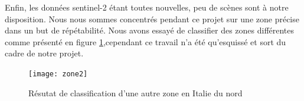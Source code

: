 \documentclass[a4paper,10pt]{article}
\begin{document}
Enfin, les données sentinel-2 étant toutes nouvelles, peu de scènes sont à notre disposition. Nous nous sommes concentrés pendant ce projet sur une zone précise dans un but de répétabilité. Nous avons essayé de classifier des zones différentes comme présenté en figure \ref{fig:zone2},cependant ce travail n'a été qu'esquissé et sort du cadre de notre projet.

\begin{figure}
  \centering
    \texttt{[image: zone2]}
  \caption{Résutat de classification d'une autre zone en Italie du nord}
  \label{fig:zone2}
\end{figure}



\end{document}
